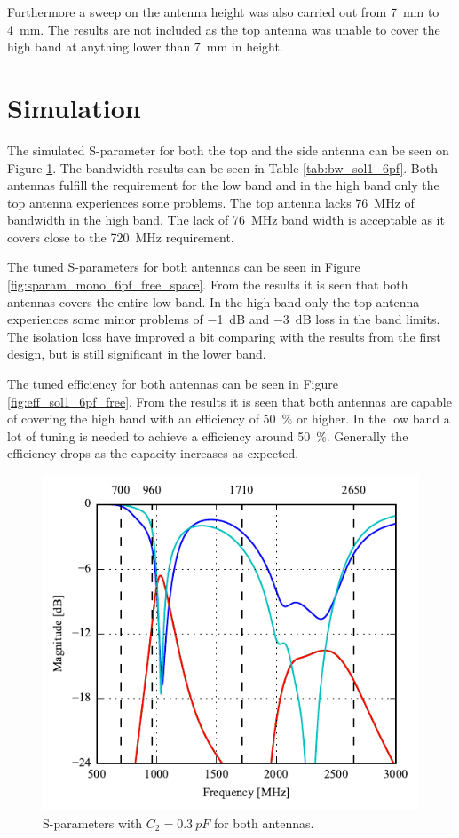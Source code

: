 Furthermore a sweep on the antenna height was also carried out from \SI{7}{mm} to \SI{4}{mm}. The results are not included as the top antenna was unable to cover the high band at anything lower than \SI{7}{mm} in height.

\FloatBarrier
\section{Simulation}

The simulated S-parameter for both the top and the side antenna can be seen on Figure \ref{fig:ant1_6pf_sparam}. The bandwidth results can be seen in Table \ref{tab:bw_sol1_6pf}. Both antennas fulfill the requirement for the low band and in the high band only the top antenna experiences some problems. The top antenna lacks \SI{76}{MHz} of bandwidth in the high band. The lack of \SI{76}{MHz} band width is acceptable as it covers close to the \SI{720}{MHz} requirement.

The tuned S-parameters for both antennas can be seen in Figure \ref{fig:sparam_mono_6pf_free_space}. From the results it is seen that both antennas covers the entire low band. In the high band only the top antenna experiences some minor problems of \SI{-1}{dB} and \SI{-3}{dB} loss in the band limits. The isolation loss have improved a bit comparing with the results from the first design, but is still significant in the lower band.     

The tuned efficiency for both antennas can be seen in Figure \ref{fig:eff_sol1_6pf_free}. From the results it is seen that both antennas are capable of covering the high band with an efficiency of \SI{50}{\percent} or higher. In the low band a lot of tuning is needed to achieve a efficiency around \SI{50}{\percent}. Generally the efficiency drops as the capacity increases as expected.  

\begin{figure}[htbp]
    \centering
    \includegraphics{img/tech_sol/monopole/5mm/sim/sweep_5mm}
    \caption{S-parameters with $C_2=\SI{0.3}{pF}$ for both antennas.}
    \label{fig:ant1_6pf_sparam}
\end{figure}

